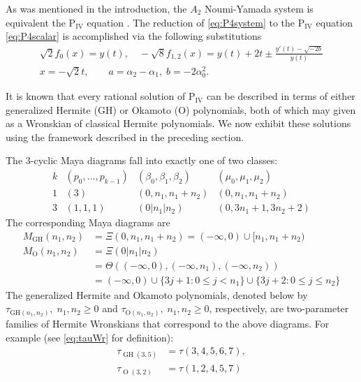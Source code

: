 \documentclass{amsart}
\theoremstyle{definition}
\newcommand{\PIV}{$\mathrm{P}_{\mathrm{IV}}\,\,$}
\newcommand{\MGH}{\operatorname{GH}}
\newcommand{\MO}{\operatorname{O}}
\begin{document}
As was mentioned in the introduction, the $A_2$ Noumi-Yamada system is
equivalent the \PIV equation
\cite{adler1994nonlinear,veselov1993dressing}.  The reduction of
\eqref{eq:P4system} to the \PIV equation \eqref{eq:P4scalar} is
accomplished via the following substitutions
\begin{gather}
  \label{eq:f123y}
  \sqrt{2}f_0(x)=y(t),\quad -\sqrt{8}f_{1,2}(x) =y(t)+2t \pm
  \frac{y'(t) - \sqrt{-2b}}{y(t)} \\
  \nonumber x=-\sqrt{2}t,\qquad a = \alpha_2-\alpha_1,\; b =
  -2\alpha_0^2.
\end{gather}


It is known \cite{clarkson2003fourth} that every rational solution of
\PIV can be described in terms of either generalized Hermite (GH) or
Okamoto (O) polynomials, both of which may given as a Wronskian of
classical Hermite polynomials.  We now exhibit these solutions using
the framework described in the preceding section.

The 3-cyclic Maya diagrams fall into exactly one of two classes:
\[
  \begin{array}{cccc}
    k & (p_0,\ldots, p_{k-1})& (\beta_0,\beta_1, \beta_2)
    &  (\mu_0,\mu_1, \mu_{2})     \\
    1 &(3)& (0,n_1,n_1+n_2)&(0,n_1,n_1+n_2) \\
    3 &(1,1,1) & (0|n_1|n_2)& (0,3 n_1+1,3 n_2+2)
\end{array}
\]
The corresponding Maya diagrams are
\begin{align*}
  M_{\MGH}(n_1,n_2)
  &= \Xi(0,n_1,n_1+n_2) = (-\infty,0) \cup   [n_1,n_1+n_2) \\
  M_{\MO}(n_1,n_2)
  &= \Xi(0|n_1|n_2) \\
  &=\Theta((-\infty,0),(-\infty,n_1), (-\infty,n_2))\\
  &= (-\infty,0) \cup \{ 3j+1 \colon 0\leq j<
    n_1\} \cup \{ 3j+2 \colon 0 \leq j \leq n_2 \}
\end{align*}
The generalized Hermite and Okamoto polynomials, denoted below by
$\tau_{\text{GH}(n_1,n_2)},\; n_1,n_2\geq 0$ and
$\tau_{\text{O}(n_1,n_2)},\;n_1,n_2\geq 0$, respectively, are
two-parameter families of Hermite Wronskians that correspond to the
above diagrams.  For example (see \eqref{eq:tauWr} for definition):
\begin{align*}
  \tau_{\MGH(3,5)} &= \tau(3,4,5,6,7),\\
  \tau_{\MO(3,2)} &= \tau(1,2,4,5,7)
\end{align*}
\end{document}
